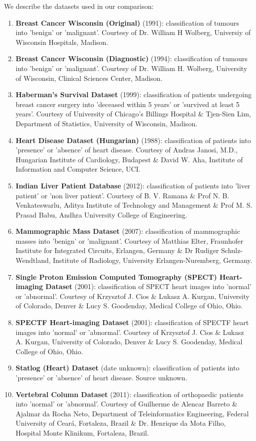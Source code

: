 \documentclass{bioinfo}
\begin{document}
\begin{methods}
We describe the datasets used in our comparison:

\begin{enumerate}
    \item \textbf{Breast Cancer Wisconsin (Original)} (1991): classification of tumours into 'benign' or 'malignant'. Courtesy of Dr. William H Wolberg, Universiy of Wisconsin Hospitals, Madison.
    \item \textbf{Breast Cancer Wisconsin (Diagnostic)} (1994): classification of tumours into 'benign' or 'malignant'. Courtesy of Dr. William H. Wolberg, University of Wisconsin, Clinical Sciences Center, Madison.
    \item \textbf{Haberman's Survival Dataset} (1999): classification of patients undergoing breast cancer surgery into 'deceased within 5 years' or 'survived at least 5 years'. Courtesy of University of Chicago's Billings Hospital \& Tjen-Sien Lim, Department of Statistics, University of Wisconsin, Madison.
    \item \textbf{Heart Disease Dataset (Hungarian)} (1988): classification of patients into 'presence' or 'absence' of heart disease. Courtesy of Andras Janosi, M.D., Hungarian Institute of Cardiology, Budapest \& David W. Aha, Institute of Information and Computer Science, UCI.
    \item \textbf{Indian Liver Patient Database} (2012): classification of patients into 'liver patient' or 'non liver patient'. Courtesy of B. V. Ramana \& Prof N. B. Venkateswarlu, Aditya Institute of Technology and Management \& Prof M. S. Prasad Babu, Andhra University College of Engineering.
    \item \textbf{Mammographic Mass Dataset} (2007): classification of mammographic masses into 'benign' or 'malignant'. Courtesy of Matthias Elter, Fraunhofer Institute for Integrated Circuits, Erlangen, Germany \& Dr Rudiger Schulz-Wendtland, Institute of Radiology, University Erlangen-Nuremberg, Germany.
    \item \textbf{Single Proton Emission Computed Tomography (SPECT) Heart-imaging Dataset} (2001): classification of SPECT heart images into 'normal' or 'abnormal'. Courtesy of Krzysztof J. Cios \& Lukasz A. Kurgan, University of Colorado, Denver \& Lucy S. Goodenday, Medical College of Ohio, Ohio.
    \item \textbf{SPECTF Heart-imaging Dataset} (2001): classification of SPECTF heart images into 'normal' or 'abnormal'. Courtesy of Krzysztof J. Cios \& Lukasz A. Kurgan, University of Colorado, Denver \& Lucy S. Goodenday, Medical College of Ohio, Ohio.
    \item \textbf{Statlog (Heart) Dataset} (date unknown): classification of patients into 'presence' or 'absence' of heart disease. Source unknown.
    \item \textbf{Vertebral Column Dataset} (2011): classification of orthopaedic patients into 'normal' or 'abnormal'. Courtesy of Guilherme de Alencar Barreto \& Ajalmar da Rocha Neto, Department of Teleinformatics Engineering, Federal University of Ceará, Fortaleza, Brazil \& Dr. Henrique da Mota Filho, Hospital Monte Klinikum, Fortaleza, Brazil.
\end{enumerate}


\end{methods}
\end{document}
